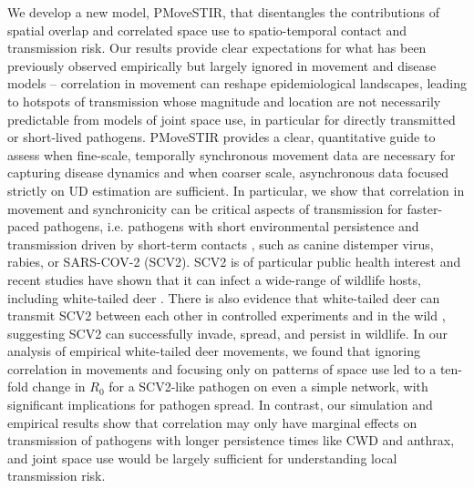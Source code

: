\documentclass[letterpaper]{article}
\begin{document}
We develop a new model, PMoveSTIR, that disentangles the contributions of spatial overlap and correlated space use to spatio-temporal contact and transmission risk. Our results provide clear expectations for what has been previously observed empirically but largely ignored in movement and disease models -- correlation in movement can reshape epidemiological landscapes, leading to hotspots of transmission whose magnitude and location are not necessarily predictable from models of joint space use, in particular for directly transmitted or short-lived pathogens.  
PMoveSTIR provides a clear, quantitative guide to assess when fine-scale, temporally synchronous movement data are necessary for capturing disease dynamics and when coarser scale, asynchronous data focused strictly on UD estimation are sufficient. 
In particular, we show that correlation in movement and synchronicity can be critical aspects of transmission for faster-paced pathogens, i.e. pathogens with short environmental persistence and transmission driven by short-term contacts \citep[cf.][]{Dougherty2018,Manlove2022}, such as canine distemper virus, rabies, or SARS-COV-2 (SCV2). 
SCV2 is of particular public health interest and recent studies have shown that it can infect a wide-range of wildlife hosts, including white-tailed deer \citep{Palmer2021,Hale2022}. There is also evidence that white-tailed deer can transmit SCV2 between each other in controlled experiments and in the wild \citep{Martins2022,Hale2022}, suggesting SCV2 can successfully invade, spread, and persist in wildlife.  In our analysis of empirical white-tailed deer movements, we found that ignoring correlation in movements and focusing only on patterns of space use led to a ten-fold change in $R_0$ for a SCV2-like pathogen on even a simple network, with significant implications for pathogen spread.  In contrast, our simulation and empirical results show that correlation may only have marginal effects on transmission of pathogens with longer persistence times like CWD and anthrax, and joint space use would be largely sufficient for understanding local transmission risk.
\end{document}

